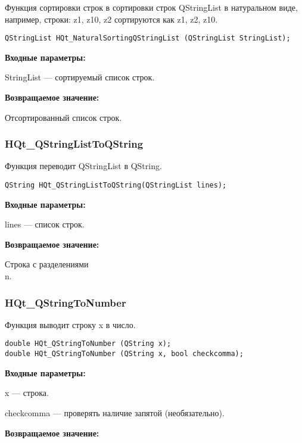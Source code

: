 \documentclass[a4paper,12pt]{article}
\begin{document}
Функция сортировки строк в сортировки строк QStringList в натуральном виде, например, строки: z1, z10, z2 сортируются как z1, z2, z10.


\begin{lstlisting}[label=code_syntax_HQt_NaturalSortingQStringList,caption=Синтаксис]
QStringList HQt_NaturalSortingQStringList (QStringList StringList);
\end{lstlisting}

\textbf{Входные параметры:}

StringList --- сортируемый список строк.

\textbf{Возвращаемое значение:}
 
Отсортированный список строк.


\subsubsection{HQt\_QStringListToQString}\label{HQt_QStringListToQString}

Функция переводит QStringList в QString.


\begin{lstlisting}[label=code_syntax_HQt_QStringListToQString,caption=Синтаксис]
QString HQt_QStringListToQString(QStringList lines);
\end{lstlisting}

\textbf{Входные параметры:}
 
lines --- список строк.

\textbf{Возвращаемое значение:}

Строка с разделениями \\n.


\subsubsection{HQt\_QStringToNumber}\label{HQt_QStringToNumber}

Функция выводит строку x в число.


\begin{lstlisting}[label=code_syntax_HQt_QStringToNumber,caption=Синтаксис]
double HQt_QStringToNumber (QString x);
double HQt_QStringToNumber (QString x, bool checkcomma);
\end{lstlisting}

\textbf{Входные параметры:}

x --- строка.

checkcomma --- проверять наличие запятой (необязательно).

\textbf{Возвращаемое значение:}
 
\end{document}
